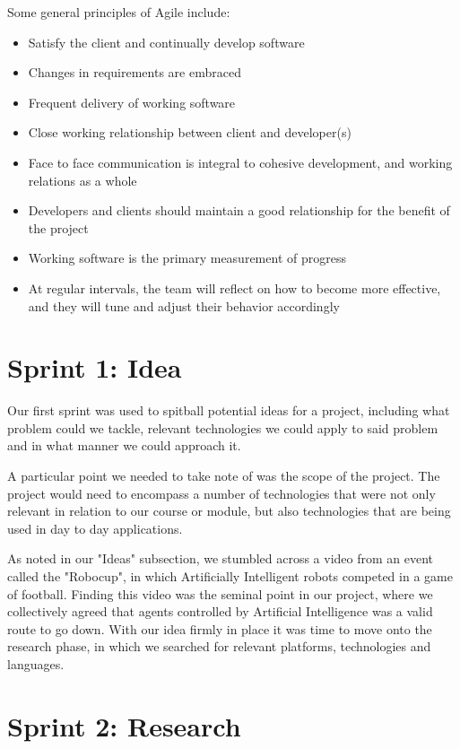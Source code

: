 Some general principles of Agile include:

\begin{itemize}
    \item{Satisfy the client and continually develop software}
    \item{Changes in requirements are embraced}
    \item{Frequent delivery of working software} 
    \item{Close working relationship between client and developer(s)}
    \item{Face to face communication is integral to cohesive development, and working relations as a whole}
    \item{Developers and clients should maintain a good relationship for the benefit of the project}
    \item{Working software is the primary measurement of progress}
    \item{At regular intervals, the team will reflect on how to become more effective, and they will tune and adjust their behavior accordingly}
\end{itemize}

\section{Sprint 1: Idea}
	
	Our first sprint was used to spitball potential ideas for a project, including what problem could we tackle, relevant technologies we could apply to said problem and in what manner we could approach it.
	
	A particular point we needed to take note of was the scope of the project. The project would need to encompass a number of technologies that were not only relevant in relation to our course or module, but also technologies that are being used in day to day applications. 
	
	As noted in our "Ideas" subsection, we stumbled across a video from an event called the "Robocup", in which Artificially Intelligent robots competed in a game of football. Finding this video was the seminal point in our project, where we collectively agreed that agents controlled by Artificial Intelligence was a valid route to go down. With our idea firmly in place it was time to move onto the research phase, in which we searched for relevant platforms, technologies and languages.
	
\section{Sprint 2: Research}
	
